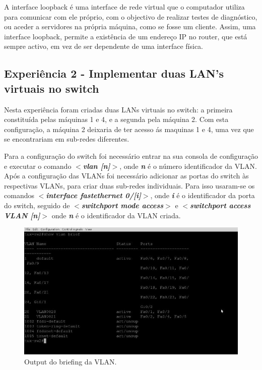 \documentclass[a4paper]{article}
\begin{document}
\pagebreak

A interface loopback é uma interface de rede virtual que o computador utiliza para comunicar com ele próprio, com o objectivo de realizar testes de diagnóstico, ou aceder a servidores na própria máquina, como se fosse um cliente. Assim, uma interface loopback, permite a existência de um endereço IP no router, que está sempre activo, em vez de ser dependente de uma interface física.

\subsection{Experiência 2 - Implementar duas LAN's virtuais no switch}
Nesta experiência foram criadas duas LANs virtuais no switch: a primeira constituída pelas máquinas 1 e 4, e a segunda pela máquina 2. Com esta configuração, a máquina 2 deixaria de ter acesso ás maquinas 1 e 4, uma vez que se encontrariam em sub-redes diferentes.

Para a configuração do switch foi necessário entrar na sua consola de configuração e executar o comando \textbf{\textit{$<$vlan [n]$>$}}, onde \textbf{\textit{n}} é o número identificador da VLAN. Após a configuração das VLANs foi necessário adicionar as portas do switch às respectivas VLANs, para criar duas sub-redes individuais. Para isso usaram-se os comandos \textbf{\textit{$<$interface fastethernet 0/[i]$>$}}, onde \textbf{\textit{i}} é o identificador da porta do switch, seguido de \textbf{\textit{$<$switchport mode access$>$}} e \textbf{\textit{$<$switchport access VLAN [n]$>$}} onde \textit{\textbf{n}} é o identificador da VLAN criada.

\begin{figure}[h!]
\centering
\includegraphics[scale=0.3]{res/image3.jpg}
\caption{Output do briefing da VLAN.}
\end{figure}
\end{document}
